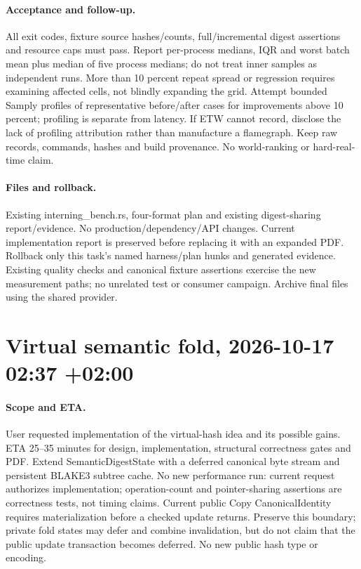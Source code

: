 \documentclass[11pt,a4paper]{article}
\begin{document}
\paragraph{Acceptance and follow-up.} All exit codes, fixture source hashes/counts,
full/incremental digest assertions and resource caps must pass. Report per-process
medians, IQR and worst batch mean plus median of five process medians; do not treat
inner samples as independent runs. More than 10 percent repeat spread or regression
requires examining affected cells, not blindly expanding the grid. Attempt bounded
Samply profiles of representative before/after cases for improvements above 10 percent;
profiling is separate from latency. If ETW cannot record, disclose the lack of
profiling attribution rather than manufacture a flamegraph. Keep raw records,
commands, hashes and build provenance. No world-ranking or hard-real-time claim.
\paragraph{Files and rollback.} Existing interning\_bench.rs, four-format plan and
existing digest-sharing report/evidence. No production/dependency/API changes.
Current implementation report is preserved before replacing it with an expanded PDF.
Rollback only this task's named harness/plan hunks and generated evidence. Existing
quality checks and canonical fixture assertions exercise the new measurement paths;
no unrelated test or consumer campaign. Archive final files using the shared provider.


\section*{Virtual semantic fold, 2026-10-17 02:37 +02:00}
\paragraph{Scope and ETA.} User requested implementation of the virtual-hash idea
and its possible gains. ETA 25--35 minutes for design, implementation, structural
correctness gates and PDF. Extend SemanticDigestState with a deferred canonical
byte stream and persistent BLAKE3 subtree cache. No new performance run: current
request authorizes implementation; operation-count and pointer-sharing assertions
are correctness tests, not timing claims. Current public Copy CanonicalIdentity
requires materialization before a checked update returns. Preserve this boundary;
private fold states may defer and combine invalidation, but do not claim that the
public update transaction becomes deferred. No new public hash type or encoding.
\end{document}
